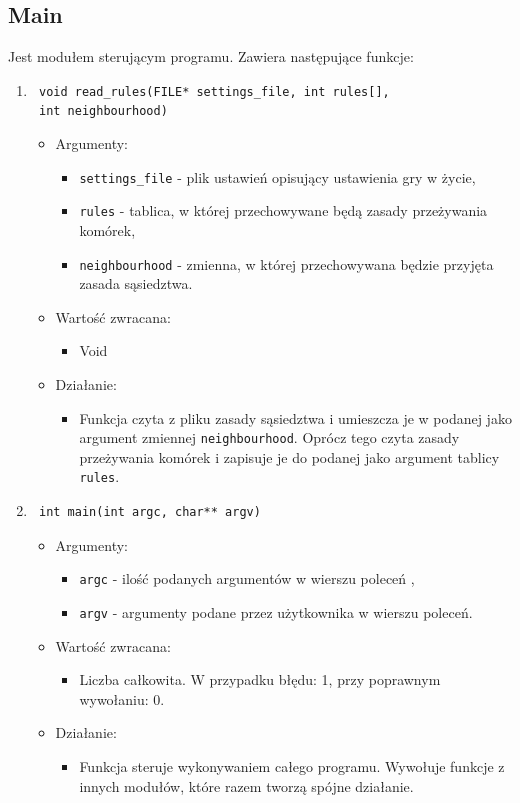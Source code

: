 \documentclass[a4paper,11pt, notitlepage ]{article}
\begin{document}
\subsection{Main}
Jest modułem sterującym programu. Zawiera następujące funkcje:
\begin{enumerate}

\item \verb+ void read_rules(FILE* settings_file, int rules[],+ \\\verb+ int neighbourhood)+
\begin{itemize}
\item Argumenty:
\begin{itemize}
\item \verb+settings_file+ - plik ustawień opisujący ustawienia gry w życie,
\item \verb+rules+ - tablica, w której przechowywane będą zasady przeżywania komórek,
\item \verb+neighbourhood+ - zmienna, w której przechowywana będzie przyjęta zasada sąsiedztwa.
\end{itemize}
\item Wartość zwracana:
\begin{itemize}
\item Void
\end{itemize}
\item Działanie:
\begin{itemize}
\item Funkcja czyta z pliku zasady sąsiedztwa i umieszcza je w podanej jako argument zmiennej \verb+neighbourhood+.
Oprócz tego czyta zasady przeżywania komórek i zapisuje je do podanej jako argument tablicy \verb+rules+. 
\end{itemize}
\end{itemize}


\item \begin{verbatim} int main(int argc, char** argv) \end{verbatim}
\begin{itemize}
\item Argumenty:
\begin{itemize}
\item \verb+argc+ - ilość podanych argumentów w wierszu poleceń ,
\item \verb+argv+ - argumenty podane przez użytkownika w wierszu poleceń.
\end{itemize}
\item Wartość zwracana:
\begin{itemize}
\item Liczba całkowita. W przypadku błędu: 1, przy poprawnym wywołaniu: 0.
\end{itemize}
\item Działanie:
\begin{itemize}
\item Funkcja steruje wykonywaniem całego programu. Wywołuje funkcje z innych modułów, które razem tworzą spójne działanie. 
\end{itemize}
\end{itemize}

\end{enumerate}
\end{document}
